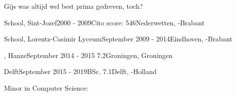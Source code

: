 
\begin{rSection}{}
  Gijs was altijd wel best prima gedreven, toch?
\end{rSection}


\begin{rSection}{}
  \begin{experienceItem}
    { School, Sint-Jozef}{2000 - 2009}{Cito score: 546}{Nederwetten, -Brabant}
  \end{experienceItem}

  \begin{experienceItem}
    { School, Lorentz-Casimir Lyceum}{September 2009 -  2014}{}{Eindhoven, -Brabant}
  \end{experienceItem}

  \begin{experienceItem}
    {, Hanze}{September 2014 -  2015} { 7.2}{Groningen, Groningen}
  \end{experienceItem}

  \begin{experienceItem}
    { Delft}{September 2015 -  2019}{BSc.  7.1}{Delft, -Holland}
  \end{experienceItem}
  \begin{experienceItem}
    {}{}{ Minor in Computer Science:}{}
  \end{experienceItem}


\end{rSection}
